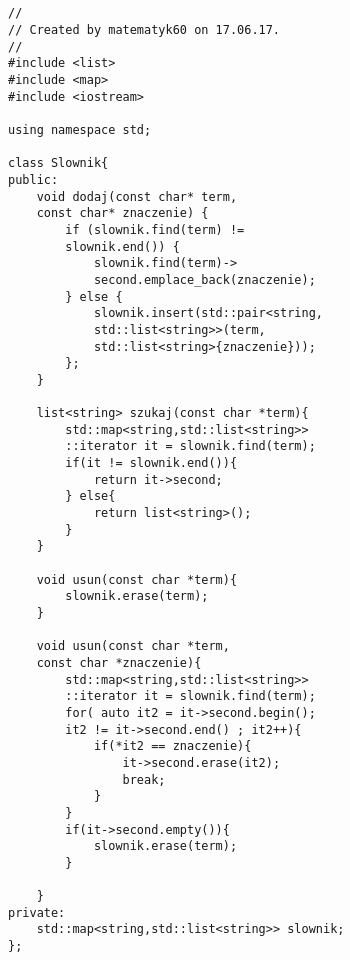 \documentclass{article}
\begin{document}
\newpage

\subsection{}
\begin{multicols}{2}
\begin{verbatim}
//
// Created by matematyk60 on 17.06.17.
//
#include <list>
#include <map>
#include <iostream>

using namespace std;

class Slownik{
public:
    void dodaj(const char* term, 
    const char* znaczenie) {
        if (slownik.find(term) != 
        slownik.end()) {
            slownik.find(term)->
            second.emplace_back(znaczenie);
        } else {
            slownik.insert(std::pair<string,
            std::list<string>>(term,
            std::list<string>{znaczenie}));
        };
    }

    list<string> szukaj(const char *term){
        std::map<string,std::list<string>>
        ::iterator it = slownik.find(term);
        if(it != slownik.end()){
            return it->second;
        } else{
            return list<string>();
        }
    }

    void usun(const char *term){
        slownik.erase(term);
    }

    void usun(const char *term,
    const char *znaczenie){
        std::map<string,std::list<string>>
        ::iterator it = slownik.find(term);
        for( auto it2 = it->second.begin();
        it2 != it->second.end() ; it2++){
            if(*it2 == znaczenie){
                it->second.erase(it2);
                break;
            }
        }
        if(it->second.empty()){
            slownik.erase(term);
        }

    }
private:
    std::map<string,std::list<string>> slownik;
};
\end{verbatim}
\end{multicols}

\newpage
\end{document}
